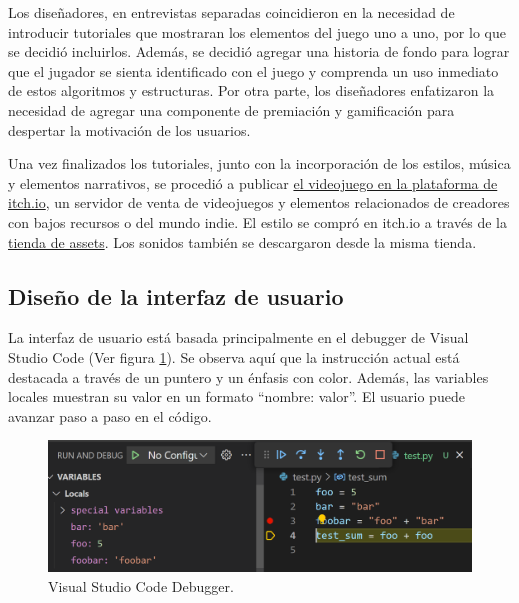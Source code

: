 Los diseñadores, en entrevistas separadas coincidieron en la necesidad de introducir tutoriales que mostraran los elementos del juego uno a uno, por lo que se decidió incluirlos. Además, se decidió agregar una historia de fondo para lograr que el jugador se sienta identificado con el juego y comprenda un uso inmediato de estos algoritmos y estructuras. Por otra parte, los diseñadores enfatizaron la necesidad de agregar una componente de premiación y gamificación para despertar la motivación de los usuarios.

Una vez finalizados los tutoriales, junto con la incorporación de los estilos, música y elementos narrativos, se procedió a publicar \href{https://alasaltum.itch.io/igasce}{el videojuego en la plataforma de itch.io}, un servidor de venta de videojuegos y elementos relacionados de creadores con bajos recursos o del mundo indie. El estilo se compró en itch.io a través de la \href{https://azagaya.itch.io/sci-fi-theme}{tienda de assets}. Los sonidos también se descargaron desde la misma tienda.


\subsection{Diseño de la interfaz de usuario}

La interfaz de usuario está basada principalmente en el debugger de Visual Studio Code \cite{vscode} (Ver figura \ref{VScodeDebugger}). Se observa aquí que la instrucción actual está destacada a través de un puntero y un énfasis con color. Además, las variables locales muestran su valor en un formato ``nombre: valor''. El usuario puede avanzar paso a paso en el código.

\begin{figure}[h]
	\centering
	\includegraphics[scale=0.3]{imagenes/VScodeDebugger.png}
	\caption{Visual Studio Code Debugger.}
	\label{VScodeDebugger}
\end{figure}

